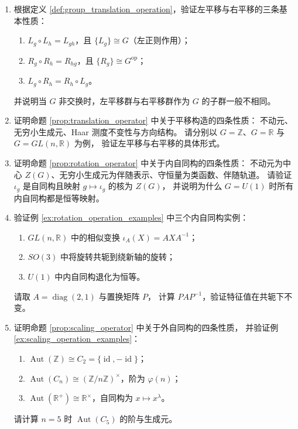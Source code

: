 \begin{enumerate}[leftmargin=3em, label=\textbf{题 \arabic*}]
    \item 根据定义 \ref{def:group_translation_operation}，验证左平移与右平移的三条基本性质：
    \begin{enumerate}[label=(\roman*)]
        \item $L_g\circ L_h=L_{gh}$，且 $\{L_g\}\cong G$（左正则作用）；
        \item $R_g\circ R_h=R_{hg}$，且 $\{R_g\}\cong G^{\text{op}}$；
        \item $L_g\circ R_h=R_h\circ L_g$。
    \end{enumerate}
    并说明当 $G$ 非交换时，左平移群与右平移群作为 $G$ 的子群一般不相同。

    \item 证明命题 \ref{prop:translation_operator} 中关于平移构造的四条性质：
    不动元、无穷小生成元、Haar 测度不变性与方向结构。
    请分别以 $G=\mathbb{Z}$、$G=\mathbb{R}$ 与 $G=GL(n,\mathbb{R})$ 为例，
    验证左平移与右平移的具体形式。

    \item 证明命题 \ref{prop:rotation_operator} 中关于内自同构的四条性质：
    不动元为中心 $Z(G)$、无穷小生成元为伴随表示、守恒量为类函数、伴随轨道。
    请验证 $\iota_g$ 是自同构且映射 $g\mapsto\iota_g$ 的核为 $Z(G)$，
    并说明为什么 $G=U(1)$ 时所有内自同构都是恒等映射。

    \item 验证例 \ref{ex:rotation_operation_examples} 中三个内自同构实例：
    \begin{enumerate}[label=(\roman*)]
        \item $GL(n,\mathbb{R})$ 中的相似变换 $\iota_A(X)=AXA^{-1}$；
        \item $SO(3)$ 中将旋转共轭到绕新轴的旋转；
        \item $U(1)$ 中内自同构退化为恒等。
    \end{enumerate}
    请取 $A=\operatorname{diag}(2,1)$ 与置换矩阵 $P$，
    计算 $PAP^{-1}$，验证特征值在共轭下不变。

    \item 证明命题 \ref{prop:scaling_operator} 中关于外自同构的四条性质，
    并验证例 \ref{ex:scaling_operation_examples}：
    \begin{enumerate}[label=(\roman*)]
        \item $\operatorname{Aut}(\mathbb{Z})\cong C_2=\{\operatorname{id},-\operatorname{id}\}$；
        \item $\operatorname{Aut}(C_n)\cong(\mathbb{Z}/n\mathbb{Z})^\times$，阶为 $\varphi(n)$；
        \item $\operatorname{Aut}(\mathbb{R}^+)\cong\mathbb{R}^\times$，自同构为 $x\mapsto x^\lambda$。
    \end{enumerate}
    请计算 $n=5$ 时 $\operatorname{Aut}(C_5)$ 的阶与生成元。


\end{enumerate}
